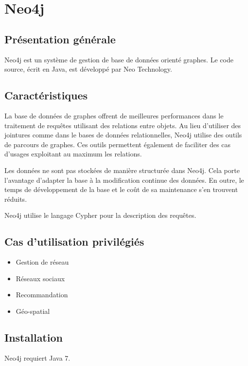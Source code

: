 \section{Neo4j}

\subsection{Présentation générale}

Neo4j est un système de gestion de base de données orienté graphes. Le code source, écrit en Java, est développé par Neo Technology.

\subsection{Caractéristiques}

La base de données de graphes offrent de meilleures performances dans le traitement de requêtes utilisant des relations entre objets. Au lieu d'utiliser des jointures comme dans le bases de données relationnelles, Neo4j utilise des outils de parcours de graphes. Ces outils permettent également de faciliter des cas d'usages exploitant au maximum les relations.

Les données ne sont pas stockées de manière structurée dans Neo4j. Cela porte l'avantage d'adapter la base à la modification continue des données. En outre, le temps de développement de la base et le coût de sa maintenance s'en trouvent réduits.

Neo4j utilise le langage Cypher pour la description des requêtes. 

\subsection{Cas d'utilisation privilégiés}

\begin{itemize}
      \item Gestion de réseau
      \item Réseaux sociaux
      \item Recommandation
      \item Géo-spatial
\end{itemize}

\subsection{Installation}

Neo4j requiert Java 7.

